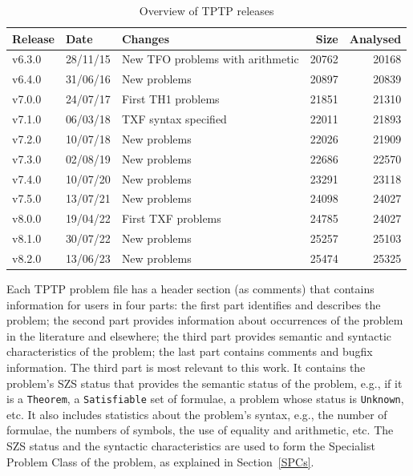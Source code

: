 \documentclass[runningheads]{llncs}
\begin{document}
\begin{table}[tb]
\begin{center}
\setlength{\tabcolsep}{4pt}
\begin{tabular}{ll|l|rr}
Release & Date     & Changes                                 & Size & Analysed \\
\hline
v6.3.0  & 28/11/15 & New TFO problems with arithmetic        &   20762 & 20168 \\
v6.4.0  & 31/06/16 & New problems                            &   20897 & 20839 \\
v7.0.0  & 24/07/17 & First TH1 problems                      &   21851 & 21310 \\
v7.1.0  & 06/03/18 & TXF syntax specified                    &   22011 & 21893 \\
v7.2.0  & 10/07/18 & New problems                            &   22026 & 21909 \\
v7.3.0  & 02/08/19 & New problems                            &   22686 & 22570 \\
v7.4.0  & 10/07/20 & New problems                            &   23291 & 23118 \\
v7.5.0  & 13/07/21 & New problems                            &   24098 & 24027 \\
v8.0.0  & 19/04/22 & First TXF problems                      &   24785 & 24027 \\
v8.1.0  & 30/07/22 & New problems                            &   25257 & 25103 \\
v8.2.0  & 13/06/23 & New problems                            &   25474 & 25325 \\
\end{tabular}
\end{center}
\caption{Overview of TPTP releases}
\label{TPTPReleases}
\end{table}

Each TPTP problem file has a header section (as comments) that contains information for users
in four parts:
the first part identifies and describes the problem;
the second part provides information about occurrences of the problem in the literature and 
elsewhere;
the third part provides semantic and syntactic characteristics of the problem;
the last part contains comments and bugfix information.
The third part is most relevant to this work. 
It contains the problem's SZS status \cite{SZS03} that provides the semantic status of the 
problem, e.g., if it is a {\tt Theorem}, a {\tt Satisfiable} set of formulae, a problem whose 
status is {\tt Unknown}, etc.
It also includes statistics about the problem's syntax, e.g., the number of formulae, the 
numbers of symbols, the use of equality and arithmetic, etc.
The SZS status and the syntactic characteristics are used to form the Specialist Problem Class
of the problem, as explained in Section~\ref{SPCs}.
\end{document}
